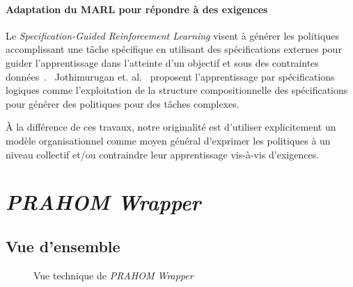 \documentclass[demonstration]{jfsma}
\newcommand{\jp}[1]{\textbf{\color{red} JPJ: #1}}
\begin{document}
\paragraph{\textbf{Adaptation du MARL pour répondre à des exigences}}
%
%
Le \emph{Specification-Guided Reinforcement Learning} visent à générer les politiques accomplissant une tâche spécifique en utilisant des spécifications externes pour guider l'apprentissage dans l'atteinte d'un objectif et sous des contraintes données~\cite{Bansal2022}.%
%
%
~Jothimurugan et. al.~\cite{Jothimurugan2021} proposent l'apprentissage par spécifications logiques comme l'exploitation de la structure compositionnelle des spécifications pour générer des politiques pour des tâches complexes.

À la différence de ces travaux, notre originalité est d'utiliser explicitement un modèle organisationnel comme moyen général d'exprimer les politiques à un niveau collectif et/ou contraindre leur apprentissage vis-à-vis d'exigences.




\section{\emph{PRAHOM Wrapper}}

\subsection{Vue d'ensemble}

\begin{figure}[h!]
  \centering
  
  \caption{Vue technique de \emph{PRAHOM Wrapper}}
  \label{fig:prahom_wrapper_technical_view}
\end{figure}
\end{document}
